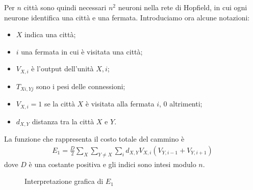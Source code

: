 \noindent Per $n$ città sono quindi necessari $n^2$ neuroni nella rete di Hopfield, in cui ogni neurone identifica una città e una fermata. Introduciamo ora alcune notazioni:
\begin{itemize}
	\item $X$ indica una città;
	\item $i$ una fermata in cui è visitata una città;
	\item $V_{X,i}$ è l'output dell'unità $X, i$;
	\item $T_{Xi, Yj}$ sono i pesi delle connessioni;
	\item $V_{X,i} = 1$ se la città $X$ è visitata alla fermata $i$, $0$ altrimenti;
	\item $d_{X,Y}$ distanza tra la città $X$ e $Y$.
\end{itemize}
La funzione che rappresenta il costo totale del cammino è
\begin{align*}
	E_1  = \frac{D}{2} \sum_X \sum_{Y \neq X} \sum_i d_{X,Y} V_{X,i} (V_{Y, i-1} + V_{Y, i+1})
\end{align*}
dove $D$ è una costante positiva e gli indici sono intesi modulo $n$.

\begin{figure}[h!]
	\centering
    
	\qquad
	\caption{Interpretazione grafica di $E_1$}
\end{figure}

